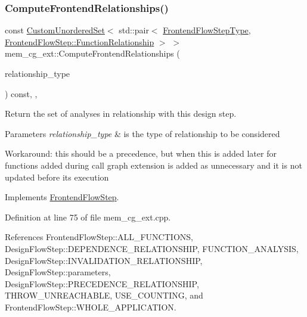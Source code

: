 \subsubsection{\texorpdfstring{Compute\+Frontend\+Relationships()}{ComputeFrontendRelationships()}}
{\footnotesize\ttfamily const \hyperlink{classCustomUnorderedSet}{Custom\+Unordered\+Set}$<$ std\+::pair$<$ \hyperlink{frontend__flow__step_8hpp_afeb3716c693d2b2e4ed3e6d04c3b63bb}{Frontend\+Flow\+Step\+Type}, \hyperlink{classFrontendFlowStep_af7cf30f2023e5b99e637dc2058289ab0}{Frontend\+Flow\+Step\+::\+Function\+Relationship} $>$ $>$ mem\+\_\+cg\+\_\+ext\+::\+Compute\+Frontend\+Relationships (\begin{DoxyParamCaption}\item[{const \hyperlink{classDesignFlowStep_a723a3baf19ff2ceb77bc13e099d0b1b7}{Design\+Flow\+Step\+::\+Relationship\+Type}}]{relationship\+\_\+type }\end{DoxyParamCaption}) const\hspace{0.3cm}{\ttfamily [override]}, {\ttfamily [protected]}, {\ttfamily [virtual]}}



Return the set of analyses in relationship with this design step. 


\begin{DoxyParams}{Parameters}
{\em relationship\+\_\+type} & is the type of relationship to be considered \\
\hline
\end{DoxyParams}
Workaround\+: this should be a precedence, but when this is added later for functions added during call graph extension is added as unnecessary and it is not updated before its execution 

Implements \hyperlink{classFrontendFlowStep_abeaff70b59734e462d347ed343dd700d}{Frontend\+Flow\+Step}.



Definition at line 75 of file mem\+\_\+cg\+\_\+ext.\+cpp.



References Frontend\+Flow\+Step\+::\+A\+L\+L\+\_\+\+F\+U\+N\+C\+T\+I\+O\+NS, Design\+Flow\+Step\+::\+D\+E\+P\+E\+N\+D\+E\+N\+C\+E\+\_\+\+R\+E\+L\+A\+T\+I\+O\+N\+S\+H\+IP, F\+U\+N\+C\+T\+I\+O\+N\+\_\+\+A\+N\+A\+L\+Y\+S\+IS, Design\+Flow\+Step\+::\+I\+N\+V\+A\+L\+I\+D\+A\+T\+I\+O\+N\+\_\+\+R\+E\+L\+A\+T\+I\+O\+N\+S\+H\+IP, Design\+Flow\+Step\+::parameters, Design\+Flow\+Step\+::\+P\+R\+E\+C\+E\+D\+E\+N\+C\+E\+\_\+\+R\+E\+L\+A\+T\+I\+O\+N\+S\+H\+IP, T\+H\+R\+O\+W\+\_\+\+U\+N\+R\+E\+A\+C\+H\+A\+B\+LE, U\+S\+E\+\_\+\+C\+O\+U\+N\+T\+I\+NG, and Frontend\+Flow\+Step\+::\+W\+H\+O\+L\+E\+\_\+\+A\+P\+P\+L\+I\+C\+A\+T\+I\+ON.

